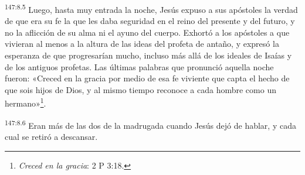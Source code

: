 \par 
\textsuperscript{147:8.5} Luego, hasta muy entrada la noche, Jesús expuso a sus apóstoles la verdad de que era su fe la que les daba seguridad en el reino del presente y del futuro, y no la aflicción de su alma ni el ayuno del cuerpo. Exhortó a los apóstoles a que vivieran al menos a la altura de las ideas del profeta de antaño, y expresó la esperanza de que progresarían mucho, incluso más allá de los ideales de Isaías y de los antiguos profetas. Las últimas palabras que pronunció aquella noche fueron: «Creced en la gracia por medio de esa fe viviente que capta el hecho de que sois hijos de Dios, y al mismo tiempo reconoce a cada hombre como un hermano»\footnote{\textit{Creced en la gracia}: 2 P 3:18.}.

\par 
\textsuperscript{147:8.6} Eran más de las dos de la madrugada cuando Jesús dejó de hablar, y cada cual se retiró a descansar.